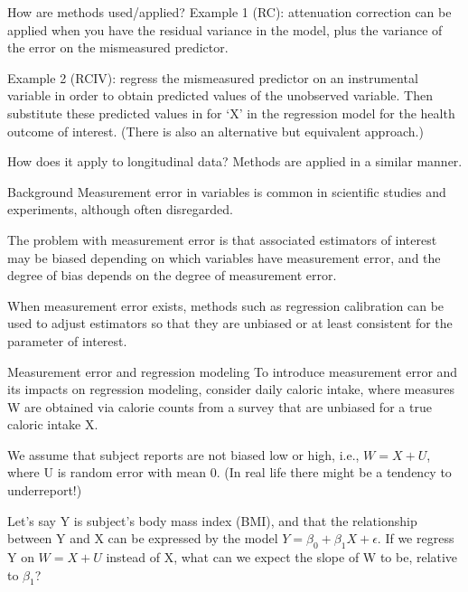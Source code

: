 \documentclass[
  9pt,
  ignorenonframetext,
]{beamer}
\begin{document}
\begin{frame}{}
\protect\hypertarget{section-6}{}
\begin{block}{How are methods used/applied?}
\protect\hypertarget{how-are-methods-usedapplied-1}{}
Example 1 (RC): attenuation correction can be applied when you have the
residual variance in the model, plus the variance of the error on the
mismeasured predictor.

Example 2 (RCIV): regress the mismeasured predictor on an instrumental
variable in order to obtain predicted values of the unobserved variable.
Then substitute these predicted values in for `X' in the regression
model for the health outcome of interest. (There is also an alternative
but equivalent approach.)
\end{block}

\begin{block}{How does it apply to longitudinal data?}
\protect\hypertarget{how-does-it-apply-to-longitudinal-data-1}{}
Methods are applied in a similar manner.
\end{block}
\end{frame}

\begin{frame}{Background}
\protect\hypertarget{background}{}
Measurement error in variables is common in scientific studies and
experiments, although often disregarded.

The problem with measurement error is that associated estimators of
interest may be biased depending on which variables have measurement
error, and the degree of bias depends on the degree of measurement
error.

When measurement error exists, methods such as regression calibration
can be used to adjust estimators so that they are unbiased or at least
consistent for the parameter of interest.
\end{frame}

\begin{frame}{Measurement error and regression modeling}
\protect\hypertarget{measurement-error-and-regression-modeling}{}
To introduce measurement error and its impacts on regression modeling,
consider daily caloric intake, where measures W are obtained via calorie
counts from a survey that are unbiased for a true caloric intake X.

We assume that subject reports are not biased low or high, i.e.,
\(W=X+U\), where U is random error with mean 0. (In real life there
might be a tendency to underreport!)

Let's say Y is subject's body mass index (BMI), and that the
relationship between Y and X can be expressed by the model
\(Y=\beta_0+\beta_1 X+ \epsilon\). If we regress Y on \(W=X+U\) instead
of X, what can we expect the slope of W to be, relative to \(\beta_1\)?
\end{frame}
\end{document}
